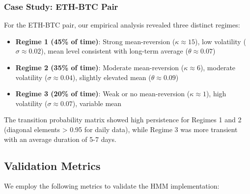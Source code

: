 \documentclass{article}
\begin{document}
\subsubsection{Case Study: ETH-BTC Pair}

For the ETH-BTC pair, our empirical analysis revealed three distinct regimes:

\begin{itemize}
    \item \textbf{Regime 1 (45\% of time)}: Strong mean-reversion ($\kappa \approx 15$), low volatility ($\sigma \approx 0.02$), mean level consistent with long-term average ($\theta \approx 0.07$)
    
    \item \textbf{Regime 2 (35\% of time)}: Moderate mean-reversion ($\kappa \approx 6$), moderate volatility ($\sigma \approx 0.04$), slightly elevated mean ($\theta \approx 0.09$)
    
    \item \textbf{Regime 3 (20\% of time)}: Weak or no mean-reversion ($\kappa \approx 1$), high volatility ($\sigma \approx 0.07$), variable mean
\end{itemize}

The transition probability matrix showed high persistence for Regimes 1 and 2 (diagonal elements > 0.95 for daily data), while Regime 3 was more transient with an average duration of 5-7 days.

\subsection{Validation Metrics}

We employ the following metrics to validate the HMM implementation:
\end{document}
